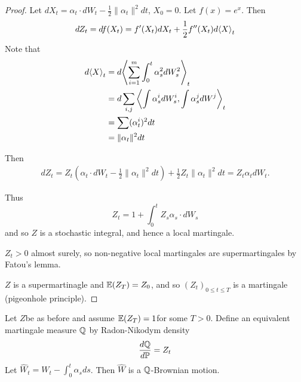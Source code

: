\begin{proof}
  Let $dX_{t} = \alpha_{t} \cdot dW_{t} - \frac{1}{2} \| \alpha_{t}
  \|^{2} dt$, $X_{0} = 0$. Let $f(x) = e^{x}$.  Then
  \begin{align}
    \label{eq:49}
    dZ_{t} = df(X_{t}) = f'(X_{t}) dX_{t} + \frac{1}{2} f''(X_{t})
    d\IP{ X }_{t}
  \end{align}
  Note that
  \begin{align}
    \label{eq:50}
    d \IP{ X }_{t} &= d \IP{\sum_{i=1}^{m} \int_{0}^{t} \alpha_{s}^{2} dW_{s}^{2}}_{t} \\
    &= d \sum_{i, j} \IP{\int \alpha_{s}^{i} dW^{i}_{s}, \int \alpha_{s}^{j} dW^{j}}_{t} \\
    &= \sum (\alpha_{t}^{i})^{2} dt \\
    &= \| \alpha_{t} \|^{2} dt
  \end{align}

  Then
  \begin{align}
    \label{eq:51}
    dZ_{t} = Z_{t} \left(\alpha_{t} \cdot dW_{t} - \frac{1}{2} \|
      \alpha_{t} \|^{2} dt \right) + \frac{1}{2} Z_{t} \| \alpha_{t}
    \|^{2} dt = Z_{t} \alpha_{t} dW_{t}.
  \end{align}

  Thus
  \begin{equation}
    \label{eq:52}
    Z_{t} = 1 + \int_{0}^{t} Z_{s} \alpha_{s} \cdot dW_{s}
  \end{equation} and so $Z$ is a stochastic integral, and hence a
  local martingale.

  $Z_{t} > 0$ almost surely, so non-negative local martingales are
  supermartingales by Fatou's lemma.

  $Z$ is a supermartinagle and $\E{Z_{T}} = Z_{0}$, and so $(Z_{t})_{0
  \leq t \leq T}$ is a martingale (pigeonhole principle).
\end{proof}

\begin{thm}
  \label{defn:continuous_time:15}
  Let $Z$be as before and assume $\E{Z_{T}} = 1$for some $T > 0$.
  Define an equivalent martingale measure $\Q$ by Radon-Nikodym
  density
  \begin{equation}
    \label{eq:53}
    \frac{d\Q}{d\Prob} = Z_{t}
  \end{equation}  Let $\hat W_{t} = W_{t} - \int_{0}^{t} \alpha_{s}
  ds$.  Then $\hat W$ is a $\Q$-Brownian motion.
\end{thm}


